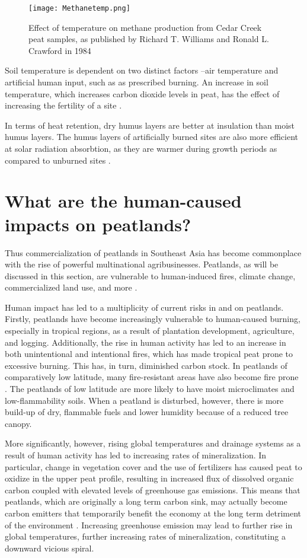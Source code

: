 \begin{figure}
\texttt{[image: Methanetemp.png]}
  \caption{Effect of temperature on methane production from Cedar Creek peat samples, as published by Richard T. Williams and Ronald L. Crawford in 1984}
  \label{fig:soiltemperature}
\end{figure}

Soil temperature is dependent on two distinct factors --air temperature and artificial human input, such as as prescribed burning. An increase in soil temperature, which increases carbon dioxide levels in peat, has the effect of increasing the fertility of a site \citep{kozlowski2012fire}.

In terms of heat retention, dry humus layers are better at insulation than moist humus layers. The humus layers of artificially burned sites are also more efficient at solar radiation absorbtion, as they are warmer during growth periods as compared to unburned sites \citep{kozlowski2012fire}.

\section{What are the human-caused impacts on peatlands?}

Thus commercialization of peatlands in Southeast Asia has become commonplace with the rise of powerful multinational agribusinesses. Peatlands, as will be discussed in this section, are vulnerable to human-induced fires, climate change, commercialized land use, and more \citep{turetsky2015global}. 

Human impact has led to a multiplicity of current risks in and on peatlands. Firstly, peatlands have become increasingly vulnerable to human-caused burning, especially in tropical regions, as a result of plantation development, agriculture, and logging. Additionally, the rise in human activity has led to an increase in both unintentional and intentional fires, which has made tropical peat prone to excessive burning. This has, in turn, diminished carbon stock. In peatlands of comparatively low latitude, many fire-resistant areas have also become fire prone \citep{turetsky2015global}. The peatlands of low latitude are more likely to have moist microclimates and low-flammability soils. When a peatland is disturbed, however, there is more build-up of dry, flammable fuels and lower humidity because of a reduced tree canopy. 

More significantly, however, rising global temperatures and drainage systems as a result of human activity has led to increasing rates of mineralization. In particular, change in vegetation cover and the use of fertilizers has caused peat to oxidize in the upper peat profile, resulting in increased flux of dissolved organic carbon coupled with elevated levels of greenhouse gas emissions. This means that peatlands, which are originally a long term carbon sink, may actually become carbon emitters that temporarily benefit the economy at the long term detriment of the environment \citep{turetsky2015global}. Increasing greenhouse emission may lead to further rise in global temperatures, further increasing rates of mineralization, constituting a downward vicious spiral.

